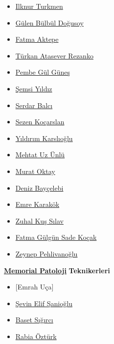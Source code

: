 \documentclass[
  letterpaper,
  DIV=11,
  numbers=noendperiod]{scrreprt}
\begin{document}
\begin{itemize}
\item
  \href{https://www.memorial.com.tr/en/doctors/ilknur-turkmen-1975}{Ilknur
  Turkmen}
\item
  \href{https://www.memorial.com.tr/doktorlar/gulen-bulbul-dogusoy}{Gülen
  Bülbül Doğusoy}
\item
  \href{https://www.memorial.com.tr/doktorlar/fatma-aktepe}{Fatma
  Aktepe}
\item
  \href{https://www.memorial.com.tr/doktorlar/turkan-atasever-rezanko}{Türkan
  Atasever Rezanko}
\item
  \href{https://www.memorial.com.tr/doktorlar/pembe-gul-gunes}{Pembe Gül
  Güneş}
\item
  \href{https://www.memorial.com.tr/doktorlar/semsi-yildiz}{Şemsi
  Yıldız}
\item
  \href{https://www.memorial.com.tr/doktorlar/serdar-balci-k}{Serdar
  Balcı}
\item
  \href{https://www.memorial.com.tr/doktorlar/sezen-kocarslan}{Sezen
  Koçarslan}
\item
  \href{https://www.memorial.com.tr/doktorlar/yildirim-karslioglu}{Yıldırım
  Karslıoğlu}
\item
  \href{https://www.memorial.com.tr/doktorlar/mehtat-uz-unlu}{Mehtat Uz
  Ünlü}
\item
  \href{https://www.memorial.com.tr/doktorlar/murat-oktay}{Murat Oktay}
\item
  \href{https://www.memorial.com.tr/doktorlar/deniz-baycelebi}{Deniz
  Bayçelebi}
\item
  \href{https://www.memorial.com.tr/doktorlar/emre-karakok}{Emre
  Karakök}
\item
  \href{https://www.memorial.com.tr/doktorlar/zuhal-kus-silav}{Zuhal Kuş
  Sılav}
\item
  \href{https://www.memorial.com.tr/doktorlar/fatma-gulgun-sade-kocak}{Fatma
  Gülgün Sade Koçak}
\item
  \href{https://www.memorial.com.tr/doktorlar/zeynep-pehlivanoglu}{Zeynep
  Pehlivanoğlu}
\end{itemize}

\href{https://patoloji.memorial.com.tr/}{\textbf{Memorial Patoloji}}
\textbf{Teknikerleri}

\begin{itemize}
\item
  {[}Emrah Uça{]}
\item
  \href{https://www.linkedin.com/in/\%C5\%9Fevin-elif-\%C5\%9Fanio\%C4\%9Flu-99449a1b0/}{Şevin
  Elif Şanioğlu}
\item
  \href{https://www.linkedin.com/in/baset-s\%C4\%B1\%C4\%9F\%C4\%B1rc\%C4\%B1-aa2406141/}{Baset
  Sığırcı}
\item
  \href{https://www.linkedin.com/in/rabia-\%C3\%B6zt\%C3\%BCrk-4989b3151/}{Rabia
  Öztürk}
\end{itemize}
\end{document}
